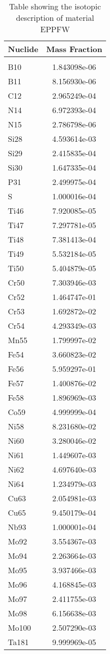 \begin{centering}
\begin{table}[ht!]
\begin{tabular}{l | c}
\hline
Nuclide & Mass Fraction\\
\hline
\\
B10 & 1.843098e-06\\
B11 & 8.156930e-06\\
C12 & 2.965249e-04\\
N14 & 6.972393e-04\\
N15 & 2.786798e-06\\
Si28 & 4.593614e-03\\
Si29 & 2.415835e-04\\
Si30 & 1.647335e-04\\
P31 & 2.499975e-04\\
S & 1.000016e-04\\
Ti46 & 7.920085e-05\\
Ti47 & 7.297781e-05\\
Ti48 & 7.381413e-04\\
Ti49 & 5.532184e-05\\
Ti50 & 5.404879e-05\\
Cr50 & 7.303946e-03\\
Cr52 & 1.464747e-01\\
Cr53 & 1.692872e-02\\
Cr54 & 4.293349e-03\\
Mn55 & 1.799997e-02\\
Fe54 & 3.660823e-02\\
Fe56 & 5.959297e-01\\
Fe57 & 1.400876e-02\\
Fe58 & 1.896969e-03\\
Co59 & 4.999999e-04\\
Ni58 & 8.231680e-02\\
Ni60 & 3.280046e-02\\
Ni61 & 1.449607e-03\\
Ni62 & 4.697640e-03\\
Ni64 & 1.234979e-03\\
Cu63 & 2.054981e-03\\
Cu65 & 9.450179e-04\\
Nb93 & 1.000001e-04\\
Mo92 & 3.554367e-03\\
Mo94 & 2.263664e-03\\
Mo95 & 3.937466e-03\\
Mo96 & 4.168845e-03\\
Mo97 & 2.411755e-03\\
Mo98 & 6.156638e-03\\
Mo100 & 2.507290e-03\\
Ta181 & 9.999969e-05
\end{tabular}
\caption{Table showing the isotopic description of material EPPFW}
\label{table:material_EPPFW}
\end{table}\clearpage


\end{centering}
